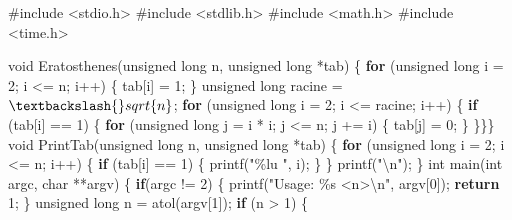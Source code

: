 \documentclass[
    ]{article}
\newenvironment{Shaded}{}{}
\newcommand{\ControlFlowTok}[1]{\textcolor[rgb]{0.00,0.44,0.13}{\textbf{#1}}}
\newcommand{\DataTypeTok}[1]{\textcolor[rgb]{0.56,0.13,0.00}{#1}}
\newcommand{\DecValTok}[1]{\textcolor[rgb]{0.25,0.63,0.44}{#1}}
\newcommand{\ImportTok}[1]{#1}
\newcommand{\NormalTok}[1]{#1}
\newcommand{\PreprocessorTok}[1]{\textcolor[rgb]{0.74,0.48,0.00}{#1}}
\newcommand{\SpecialCharTok}[1]{\textcolor[rgb]{0.25,0.44,0.63}{#1}}
\newcommand{\StringTok}[1]{\textcolor[rgb]{0.25,0.44,0.63}{#1}}
\begin{document}
\begin{Shaded}
\begin{Highlighting}[]
\PreprocessorTok{\#include }\ImportTok{\textless{}stdio.h\textgreater{}}
\PreprocessorTok{\#include }\ImportTok{\textless{}stdlib.h\textgreater{}}
\PreprocessorTok{\#include }\ImportTok{\textless{}math.h\textgreater{}}
\PreprocessorTok{\#include }\ImportTok{\textless{}time.h\textgreater{}}

\DataTypeTok{void}\NormalTok{ Eratosthenes(}\DataTypeTok{unsigned} \DataTypeTok{long}\NormalTok{ n, }\DataTypeTok{unsigned} \DataTypeTok{long}\NormalTok{ *tab) \{}
    \ControlFlowTok{for}\NormalTok{ (}\DataTypeTok{unsigned} \DataTypeTok{long}\NormalTok{ i = }\DecValTok{2}\NormalTok{; i \textless{}= n; i++) \{}
\NormalTok{        tab[i] = }\DecValTok{1}\NormalTok{;}
\NormalTok{    \}}
    \DataTypeTok{unsigned} \DataTypeTok{long}\NormalTok{ racine = $\textbackslash{}sqrt\{n\}$;}
    \ControlFlowTok{for}\NormalTok{ (}\DataTypeTok{unsigned} \DataTypeTok{long}\NormalTok{ i = }\DecValTok{2}\NormalTok{; i \textless{}= racine; i++) \{}
        \ControlFlowTok{if}\NormalTok{ (tab[i] == }\DecValTok{1}\NormalTok{) \{}
            \ControlFlowTok{for}\NormalTok{ (}\DataTypeTok{unsigned} \DataTypeTok{long}\NormalTok{ j = i * i; j \textless{}= n; j += i) \{}
\NormalTok{                tab[j] = }\DecValTok{0}\NormalTok{;}
\NormalTok{            \}}
\NormalTok{    \}\}\}}
\DataTypeTok{void}\NormalTok{ PrintTab(}\DataTypeTok{unsigned} \DataTypeTok{long}\NormalTok{ n, }\DataTypeTok{unsigned} \DataTypeTok{long}\NormalTok{ *tab) \{}
    \ControlFlowTok{for}\NormalTok{ (}\DataTypeTok{unsigned} \DataTypeTok{long}\NormalTok{ i = }\DecValTok{2}\NormalTok{; i \textless{}= n; i++) \{}
        \ControlFlowTok{if}\NormalTok{ (tab[i] == }\DecValTok{1}\NormalTok{) \{}
\NormalTok{            printf(}\StringTok{"\%lu "}\NormalTok{, i);}
\NormalTok{        \}}
\NormalTok{    \}}
\NormalTok{    printf(}\StringTok{"}\SpecialCharTok{\textbackslash{}n}\StringTok{"}\NormalTok{);}
\NormalTok{\}}
\DataTypeTok{int}\NormalTok{ main(}\DataTypeTok{int}\NormalTok{ argc, }\DataTypeTok{char}\NormalTok{ **argv) \{}
    \ControlFlowTok{if}\NormalTok{(argc != }\DecValTok{2}\NormalTok{) \{}
\NormalTok{        printf(}\StringTok{"Usage: \%s \textless{}n\textgreater{}}\SpecialCharTok{\textbackslash{}n}\StringTok{"}\NormalTok{, argv[}\DecValTok{0}\NormalTok{]);}
        \ControlFlowTok{return} \DecValTok{1}\NormalTok{;}
\NormalTok{    \}}
    \DataTypeTok{unsigned} \DataTypeTok{long}\NormalTok{ n = atol(argv[}\DecValTok{1}\NormalTok{]);}
    \ControlFlowTok{if}\NormalTok{ (n \textgreater{} }\DecValTok{1}\NormalTok{) \{}

\end{Highlighting}
\end{Shaded}
\end{document}

